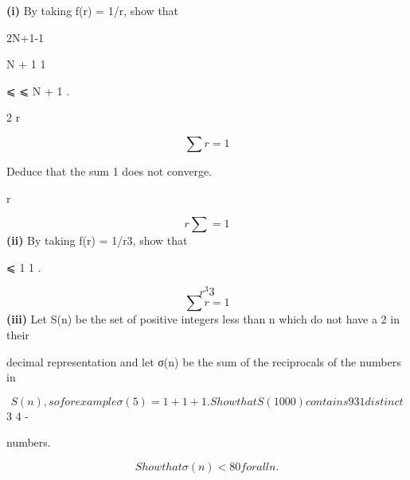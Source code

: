 \documentclass[12pt]{article}
\begin{document}
\begin{flushleft}
\textbf{(i)} By taking f(r) = 1/r, show that\par
2N+1-1\par
N + 1 1\par
⩽ ⩽ N + 1 .\par
2 r\par
\[∑r=1\]
\infty\par
Deduce that the sum 1 does not converge.\par
r\par
\[r∑=1\]
\textbf{(ii)} By taking f(r) = 1/r3, show that\par
\infty\par
⩽ 1 1 .\par
\[r^3 3\]
\[∑r=1\]
\textbf{(iii)} Let S(n) be the set of positive integers less than n which do not have a 2 in their\par
decimal representation and let σ(n) be the sum of the reciprocals of the numbers in\par
\[S(n), so for example σ(5) = 1 + 1 + 1 . Show that S(1000) contains 93 1 distinct\]
3 4 -\par
numbers.\par
\[Show that σ(n) < 80 for all n.\]
\end{flushleft}
\end{document}
